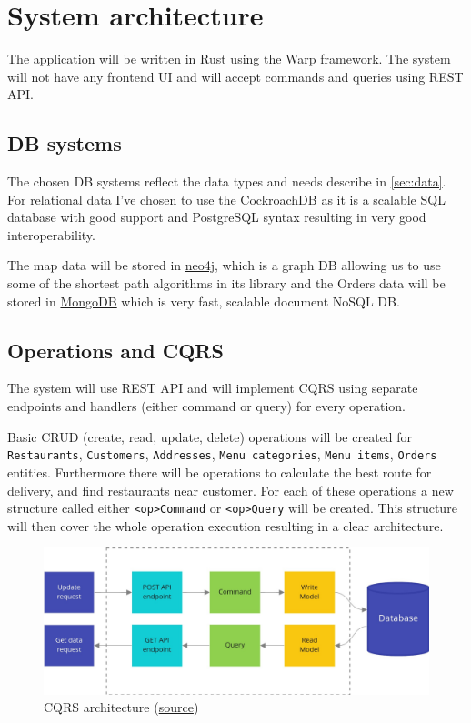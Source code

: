 \documentclass[11pt,a4paper]{article}
\begin{document}
\section{System architecture}
	The application will be written in \href{https://rust-lang.org}{Rust} using the \href{https://github.com/seanmonstar/warp}{Warp framework}. The system will not have any frontend UI and will accept commands and queries using REST API.
	
	\subsection{DB systems}
		The chosen DB systems reflect the data types and needs describe in \ref{sec:data}. For relational data I've chosen to use the \href{https://www.cockroachlabs.com/product/}{CockroachDB} as it is a scalable SQL database with good support and PostgreSQL syntax resulting in very good interoperability.
		
		The map data will be stored in \href{https://neo4j.com/}{neo4j}, which is a graph DB allowing us to use some of the shortest path algorithms in its library and the Orders data will be stored in \href{https://www.mongodb.com/}{MongoDB} which is very fast, scalable document NoSQL DB.
	
	\subsection{Operations and CQRS}
		The system will use REST API and will implement CQRS using separate endpoints and handlers (either command or query) for every operation.
		
		Basic CRUD (create, read, update, delete) operations will be created for \texttt{Restaurants}, \texttt{Customers}, \texttt{Addresses}, \texttt{Menu categories}, \texttt{Menu items}, \texttt{Orders} entities. Furthermore there will be operations to calculate the best route for delivery, and find restaurants near customer. For each of these operations a new structure called either \texttt{<op>Command} or \texttt{<op>Query} will be created. This structure will then cover the whole operation execution resulting in a clear architecture.
		
		\begin{figure}[h]
			\centering
			\includegraphics[width=0.7\linewidth]{img/cqrs-architecture}
			\caption{CQRS architecture {\tiny (\href{https://threedots.tech/post/basic-cqrs-in-go/}{source})}}
			\label{fig:cqrs-architecture}
		\end{figure}

	
%
\end{document}
